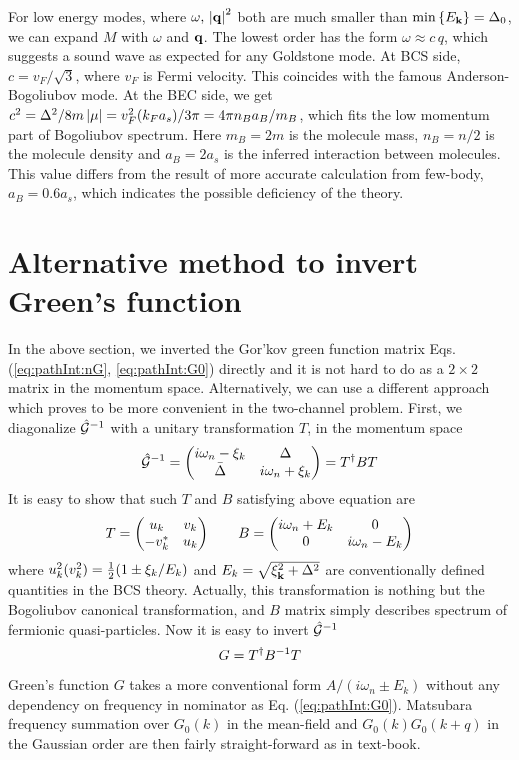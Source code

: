 For low energy modes, where $\omega,\,\left\lvert{\ensuremath{\mathbf{q}}}\right\rvert^{2}$ both are much smaller than $\min\left\{E_{\mathbf{k}}\right\}=\Delta_{0}$, we can expand $M$ with $\omega$ and $\mathbf{q}$.  The lowest order has the form $\omega\approx{}c\,q$, which suggests a sound wave as expected for any Goldstone mode.  At BCS side, $c=v_{F}/\sqrt{3}$, where $v_{F}$ is Fermi velocity.  This coincides with the famous Anderson-Bogoliubov mode.  At the BEC side, we get $c^{2}=\Delta^{2}/8m\left\lvert{\mu}\right\rvert=v_{F}^{2}(k_{F}a_{s})/3\pi=4\pi{}n_{B}a_{B}/m_{B}$, which fits the low momentum part of Bogoliubov spectrum.  Here $m_{B}=2m$ is the molecule mass, $n_{B}=n/2$ is the molecule density and $a_{B}=2a_{s}$ is the inferred  interaction between molecules.  This value differs from the result of more accurate calculation from few-body, $a_{B}=0.6a_{s}$, which indicates the possible deficiency of the theory. 


\section{Alternative method to invert Green's function\label{sec:diagonalizeGreen1}}
In the above section, we inverted the  Gor'kov green function matrix Eqs. (\ref{eq:pathInt:nG}, \ref{eq:pathInt:G0}) directly and it is not hard to do as a $2\times2$ matrix in the  momentum space.   Alternatively, we can use a different approach which proves to be more convenient in the two-channel problem.  First, we diagonalize $\hat{\mathcal{G}}^{-1}$ with a unitary transformation $T$, in the momentum space
\begin{equation}
\hat{\mathcal{G}}^{-1}=\begin{pmatrix}i\omega_{n}-\xi_{k}&\Delta\\\bar\Delta&i\omega_{n}+\xi_{k}\end{pmatrix}=T^{\dagger}BT
\end{equation}
It is easy to show that such $T$ and $B$ satisfying above equation are
\begin{equation}
T=\begin{pmatrix}u_{k}&v_{k}\\-v_{k}^{*}&u_{k}\end{pmatrix}\qquad{}B=\begin{pmatrix}i\omega_{n}+E_{k}&0\\0&i\omega_{n}-E_{k}\end{pmatrix}
\end{equation}
where $u_{k}^{2}(v_{k}^{2})=\frac{1}{2}(1\pm\xi_{k}/E_{k})$ and $E_{k}=\sqrt{\xi^{2}_{\mathbf{k}}+\Delta^{2}}$ are conventionally defined quantities in the BCS theory.   Actually, this transformation is nothing but the Bogoliubov canonical transformation, and $B$ matrix simply describes spectrum of fermionic quasi-particles.  Now it is easy to invert $\hat{\mathcal{G}}^{-1}$
\begin{equation}
G=T^{\dagger}B^{-1}T
\end{equation}
Green's function $G$ takes a more conventional form $A/(i\omega_{n}\pm{}E_{k})$ without any dependency on frequency in nominator as Eq. (\ref{eq:pathInt:G0}). Matsubara frequency summation over $G_{0}(k)$ in the mean-field and $G_{0}(k)G_{0}(k+q)$ in the Gaussian order are then fairly straight-forward as in text-book.  
